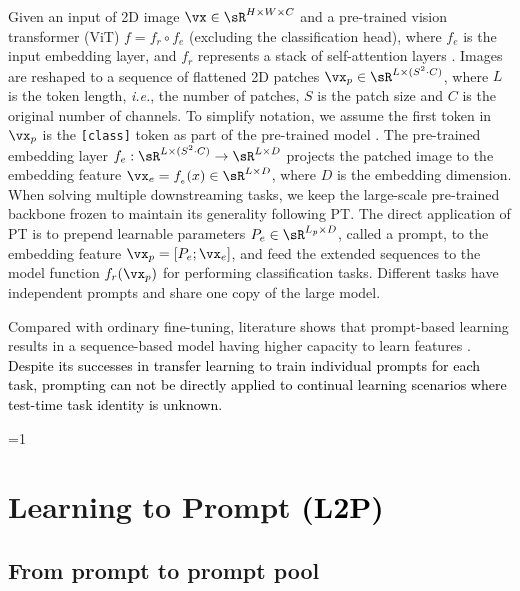 \documentclass[10pt,twocolumn,letterpaper]{article}
\newcommand{\zifeng}[1]{\textcolor{black}{#1}}
\def\ie{\emph{i.e.}\xspace}
\newcounter{alphasect}
\def\alphainsection{0}
\let\oldsection=\section
\def\section{%
  \ifnum\alphainsection=1%
    \addtocounter{alphasect}{1}
  \fi%
\oldsection}%
\begin{document}
Given an input of 2D image $\vx \in \sR ^{H \times W \times C}$ and a pre-trained vision transformer (ViT) $f = f_r \circ f_e$ (excluding the classification head), where $f_e$ is the input embedding layer, and $f_r$ represents a stack of self-attention layers \cite{dosovitskiy2020image}. 
Images are reshaped to a sequence of flattened 2D patches $\vx_p \in \sR ^{L \times (S^2\cdot C)}$, where $L$ is the token length, \ie, the number of patches, $S$ is the patch size and $C$ is the original number of channels. 
To simplify notation, we assume the first token in $\vx_p$ is the \verb|[class]| token as part of the pre-trained model \cite{dosovitskiy2020image}. 
The pre-trained embedding layer $f_{e}: \sR ^{L \times (S^2\cdot C)} \to \sR ^{L \times D}$ projects the patched image to the embedding feature $\vx_e = f_{_e}(x) \in \sR ^{L \times D}$, where $D$ is the embedding dimension.
When solving multiple downstreaming tasks, we keep the large-scale pre-trained backbone frozen to maintain its generality following PT. 
The direct application of PT is to prepend learnable parameters $P_e \in \sR ^{L_p \times D}$, called a prompt, to the embedding feature $\vx_p = [P_e; \vx_e]$, and feed the extended sequences to the model function $f_r(\vx_p)$ for performing classification tasks. 
Different tasks have independent prompts and share one copy of the large model. 

Compared with ordinary fine-tuning, literature shows that prompt-based learning results in a sequence-based model having higher capacity to learn features \cite{liu2021pre,lester2021power}. \zifeng{
Despite its successes in transfer learning to train individual prompts for each task, prompting can not be directly applied to continual learning scenarios where test-time task identity is unknown.
}









\vspace{-.2cm}
\section{Learning to Prompt \zifeng{(L2P)}}

\subsection{From prompt to prompt pool} \label{sec:prompt_look_up}
\end{document}
